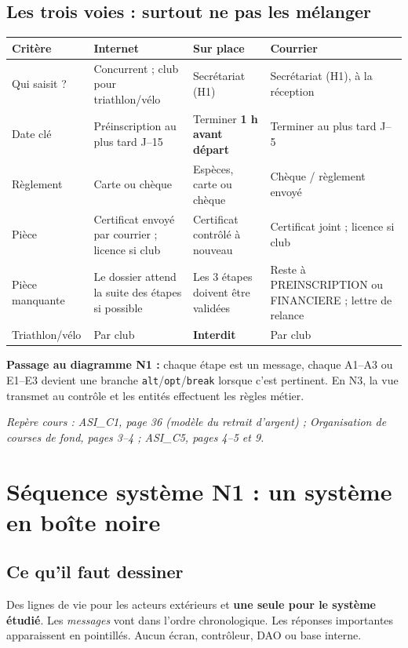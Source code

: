 \documentclass[10pt,a4paper]{article}
\newcommand{\source}[1]{\par{\footnotesize\color{bodygray}\textit{Repère cours : #1}}}
\begin{document}
\subsection{Les trois voies : surtout ne pas les mélanger}
\begin{tabularx}{\linewidth}{@{}p{28mm}XXX@{}}
\toprule
Critère & Internet & Sur place & Courrier \\
\midrule
Qui saisit ? & Concurrent ; club pour triathlon/vélo & Secrétariat (H1) & Secrétariat (H1), à la réception\\
Date clé & Préinscription au plus tard J--15 & Terminer \textbf{1 h avant départ} & Terminer au plus tard J--5\\
Règlement & Carte ou chèque & Espèces, carte ou chèque & Chèque / règlement envoyé\\
Pièce & Certificat envoyé par courrier ; licence si club & Certificat contrôlé à nouveau & Certificat joint ; licence si club\\
Pièce manquante & Le dossier attend la suite des étapes si possible & Les 3 étapes doivent être validées & Reste à PREINSCRIPTION ou FINANCIERE ; lettre de relance\\
Triathlon/vélo & Par club & \textbf{Interdit} & Par club\\
\bottomrule
\end{tabularx}
\textbf{Passage au diagramme N1 :} chaque étape est un message, chaque A1--A3 ou E1--E3 devient une branche \texttt{alt}/\texttt{opt}/\texttt{break} lorsque c'est pertinent. En N3, la vue transmet au contrôle et les entités effectuent les règles métier.\newline
\source{ASI\_C1, page 36 (modèle du retrait d'argent) ; Organisation de courses de fond, pages 3--4 ; ASI\_C5, pages 4--5 et 9.}

\section{Séquence système N1 : un système en boîte noire}
\subsection{Ce qu'il faut dessiner}
Des lignes de vie pour les acteurs extérieurs et \textbf{une seule pour le système étudié}. Les \emph{messages} vont dans l'ordre chronologique. Les réponses importantes apparaissent en pointillés. Aucun écran, contrôleur, DAO ou base interne.
\end{document}
